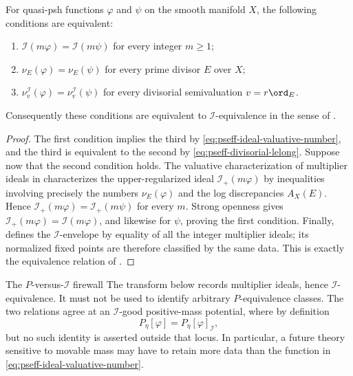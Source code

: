 \begin{proposition}\label{prop:pseff-i-equivalence-valuative}
For quasi-psh functions \(\varphi\) and \(\psi\) on the smooth manifold
\(X\), the following conditions are equivalent:
\begin{enumerate}
\item \(\mathcal I(m\varphi)=\mathcal I(m\psi)\) for every integer
      \(m\geq1\);
\item \(\nu_E(\varphi)=\nu_E(\psi)\) for every prime divisor \(E\)
      over \(X\);
\item \(\nu_v^{\mathcal I}(\varphi)=\nu_v^{\mathcal I}(\psi)\) for
      every divisorial semivaluation \(v=r\ord_E\).
\end{enumerate}
Consequently these conditions are equivalent to
\(\mathcal I\)-equivalence in the sense of
\cite[Definition~2.7]{Xia23Operations}.
\end{proposition}

\begin{proof}
The first condition implies the third by
\eqref{eq:pseff-ideal-valuative-number}, and the third is equivalent to
the second by \eqref{eq:pseff-divisorial-lelong}.  Suppose now that the
second condition holds.  The valuative characterization of multiplier
ideals in \cite[Theorem~A]{BFJ08} characterizes the upper-regularized
ideal \(\mathcal I_+(m\varphi)\) by inequalities involving precisely the
numbers \(\nu_E(\varphi)\) and the log discrepancies \(A_X(E)\).
Hence
\(\mathcal I_+(m\varphi)=\mathcal I_+(m\psi)\) for every \(m\).
Strong openness \cite{GZ15} gives
\(\mathcal I_+(m\varphi)=\mathcal I(m\varphi)\), and likewise for
\(\psi\), proving the first condition.  Finally,
\cite[Definition~2.3]{Xia23Operations} defines the
\(\mathcal I\)-envelope by equality of all the integer multiplier ideals;
its normalized fixed points are therefore classified by the same data.
This is exactly the equivalence relation of
\cite[Definition~2.7]{Xia23Operations}.
\end{proof}

\begin{warning}{The \(P\)-versus-\(\mathcal I\) firewall}
\label{warn:pseff-p-i-firewall}
The transform below records multiplier ideals, hence
\(\mathcal I\)-equivalence.  It must not be used to identify arbitrary
\(P\)-equivalence classes.  The two relations agree at an
\(\mathcal I\)-good positive-mass potential, where by definition
\[
                  P_\eta[\varphi]
                  =P_\eta[\varphi]_{\mathcal I},
\tag{71.11}\label{eq:pseff-i-good-firewall}
\]
but no such identity is asserted outside that locus.  In particular, a
future theory sensitive to movable mass may have to retain more data than
the function in \eqref{eq:pseff-ideal-valuative-number}.
\end{warning}

